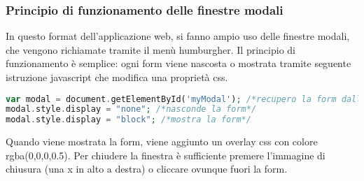\subsubsection{Principio di funzionamento delle finestre modali}
In questo format dell'applicazione web, si fanno ampio uso delle finestre modali, che vengono richiamate tramite il menù humburgher.
Il principio di funzionamento è semplice: ogni form viene nascosta o mostrata tramite seguente istruzione javascript che modifica una proprietà css.
\begin{lstlisting}[language=PHP]
var modal = document.getElementById('myModal'); /*recupero la form dall'id*/
modal.style.display = "none"; /*nasconde la form*/
modal.style.display = "block"; /*mostra la form*/
\end{lstlisting}
Quando viene mostrata la form, viene aggiunto un overlay css con colore rgba(0,0,0,0.5).
Per chiudere la finestra è sufficiente premere l'immagine di chiusura (una x in alto a destra) o cliccare ovunque fuori la form.

